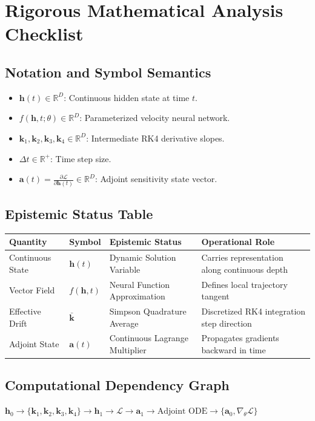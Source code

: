 \documentclass[11pt,a4paper]{article}
\theoremstyle{definition}
\begin{document}
\section{Rigorous Mathematical Analysis Checklist}

\subsection{Notation and Symbol Semantics}
\begin{itemize}
    \item $\mathbf{h}(t) \in \mathbb{R}^D$: Continuous hidden state at time $t$.
    \item $f(\mathbf{h}, t; \theta) \in \mathbb{R}^D$: Parameterized velocity neural network.
    \item $\mathbf{k}_1, \mathbf{k}_2, \mathbf{k}_3, \mathbf{k}_4 \in \mathbb{R}^D$: Intermediate RK4 derivative slopes.
    \item $\Delta t \in \mathbb{R}^+$: Time step size.
    \item $\mathbf{a}(t) = \frac{\partial \mathcal{L}}{\partial \mathbf{h}(t)} \in \mathbb{R}^D$: Adjoint sensitivity state vector.
\end{itemize}

\subsection{Epistemic Status Table}
\begin{table}[h]
\centering
\small
\begin{tabular}{@{}llll@{}}
\toprule
\textbf{Quantity} & \textbf{Symbol} & \textbf{Epistemic Status} & \textbf{Operational Role} \\
\midrule
Continuous State & $\mathbf{h}(t)$ & Dynamic Solution Variable & Carries representation along continuous depth \\
Vector Field & $f(\mathbf{h}, t)$ & Neural Function Approximation & Defines local trajectory tangent \\
Effective Drift & $\bar{\mathbf{k}}$ & Simpson Quadrature Average & Discretized RK4 integration step direction \\
Adjoint State & $\mathbf{a}(t)$ & Continuous Lagrange Multiplier & Propagates gradients backward in time \\
\bottomrule
\end{tabular}
\end{table}

\subsection{Computational Dependency Graph}
{\centering
$\mathbf{h}_0 \longrightarrow \{\mathbf{k}_1, \mathbf{k}_2, \mathbf{k}_3, \mathbf{k}_4\} \longrightarrow \mathbf{h}_1 \longrightarrow \mathcal{L} \longrightarrow \mathbf{a}_1 \longrightarrow \text{Adjoint ODE} \longrightarrow \{\mathbf{a}_0, \nabla_\theta \mathcal{L}\}$
\par}
\end{document}
